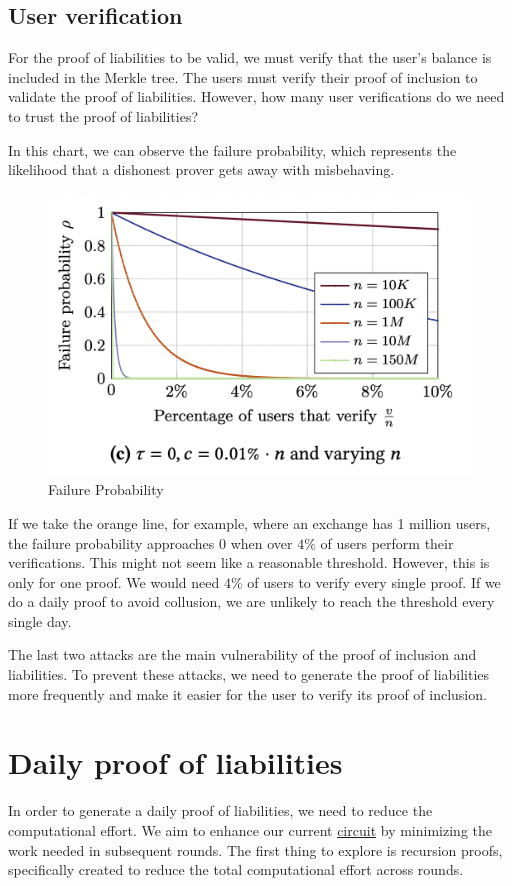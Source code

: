 \subsection{User verification}
For the proof of liabilities to be valid, we must verify that the user's balance is included in the Merkle tree. 
The users must verify their proof of inclusion to validate the proof of liabilities. 
However, how many user verifications do we need to trust the proof of liabilities?

In this chart, we can observe the failure probability, which represents the likelihood that a dishonest prover gets away with misbehaving.
\begin{figure}[H]
   \centering
   \includegraphics[width=130mm]{FailureProbability.png}
   \caption{Failure Probability \cite{GP21}}
   \label{FB}
   \end{figure}
If we take the orange line, for example, where an exchange has 1 million users, the failure probability approaches 0 when over $4\%$ of users perform their verifications.
This might not seem like a reasonable threshold. However, this is only for one proof. We would need $4\%$ of users to verify every single proof. 
If we do a daily proof to avoid collusion, we are unlikely to reach the threshold every single day.

The last two attacks are the main vulnerability of the proof of inclusion and liabilities. 
To prevent these attacks, we need to generate the proof of liabilities more frequently and make it easier for the user to verify its proof of inclusion.

\section{Daily proof of liabilities}
In order to generate a daily proof of liabilities, we need to reduce the computational effort.
We aim to enhance our current \hyperref[subsec:pl]{circuit} by minimizing the work needed in subsequent rounds.
The first thing to explore is recursion proofs, specifically created to reduce the total computational effort across rounds.

